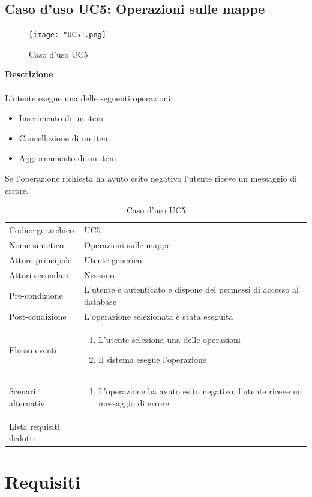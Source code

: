 \documentclass[a4paper]{report}
\newcommand{\mychapter}[2]{
	\setcounter{chapter}{#1}
	\setcounter{section}{0}
	\setcounter{subsection}{1}
	\chapter*{#2}
	\addcontentsline{toc}{chapter}{#2}
}
\begin{document}
	 \section{Caso d'uso UC5: Operazioni sulle mappe}
	 \begin{figure}[H]
			\centering
			\texttt{[image: "UC5".png]}
			\caption{Caso d'uso UC5}
		\end{figure}
	 \textbf{Descrizione} \\ \\
	 L'utente esegue una delle seguenti operazioni:
	 \begin{itemize}
	 	\item Inserimento di un item
	 	\item Cancellazione di un item
	 	\item Aggiornamento di un item
	 \end{itemize}
	 Se l'operazione richiesta ha avuto esito negativo l'utente riceve un messaggio di errore.
		\begin{table}[H]
		\begin{tabularx}{\textwidth}{X | X}\toprule
			\rowcolor{orange!65}Codice gerarchico & UC5\\
			Nome sintetico & Operazioni sulle mappe\\
			\rowcolor{orange!65}Attore principale & Utente generico\\
			Attori secondari & Nessuno \\
			\rowcolor{orange!65}Pre-condizione & L'utente è autenticato e dispone dei permessi di accesso
			al database\\
			Post-condizione & L'operazione selezionata è stata eseguita\\
			\rowcolor{orange!65}Flusso eventi & \begin{enumerate}
			\item L'utente seleziona una delle operazioni
			\item Il sistema esegue l'operazione
			\end{enumerate} \\
			Scenari alternativi & \begin{enumerate}
			\item L'operazione ha avuto esito negativo, l'utente riceve un messaggio di errore
			\end{enumerate} \\
			\rowcolor{orange!65}Lista requisiti dedotti & \\
			\bottomrule
		\end{tabularx}
		\caption{Caso d'uso UC5}
	 \end{table}
	\mychapter{4}{Requisiti}
	\cleardoublepage
	\listoffigures
	
	\cleardoublepage
	\listoftables
		
\end{document}
